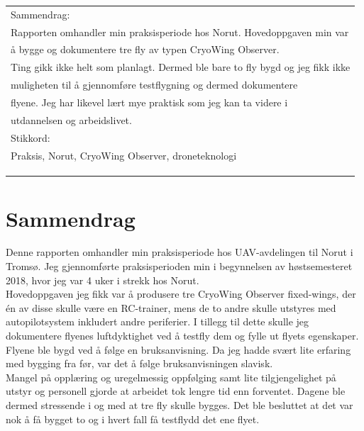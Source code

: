 \documentclass[12pt, a4paper]{article}
\begin{document}
\begin{flushleft}
	\begin{tabular}{ | l | }
		\hline
		Sammendrag: \hspace{14.7cm}
		\\
		Rapporten omhandler min praksisperiode hos Norut. Hovedoppgaven min var \\ å bygge og dokumentere tre fly av typen CryoWing Observer. \\
		Ting gikk ikke helt som planlagt. Dermed ble bare to fly bygd og jeg fikk ikke\\
		muligheten til å gjennomføre testflygning og dermed dokumentere\\ flyene.
		Jeg har likevel lært mye praktisk som 
		jeg kan ta videre i \\utdannelsen og arbeidslivet.
		\\
		\hline
		Stikkord: \\ Praksis, Norut, CryoWing Observer, droneteknologi\\ \\ \\ \\
		\hline
	\end{tabular}
\end{flushleft}

\clearpage


\section*{Sammendrag}
Denne rapporten omhandler min praksisperiode hos UAV-avdelingen til Norut i Tromsø. Jeg gjennomførte praksisperioden min i begynnelsen av høstsemesteret 2018, hvor jeg var 4 uker i strekk hos Norut. \\

Hovedoppgaven jeg fikk var å produsere tre CryoWing Observer fixed-wings, der én av disse skulle være en RC-trainer, mens de to andre skulle utstyres med autopilotsystem inkludert andre periferier. I tillegg til dette skulle jeg dokumentere flyenes luftdyktighet ved å testfly dem og fylle ut flyets egenskaper.\\

Flyene ble bygd ved å følge en bruksanvisning. Da jeg hadde svært lite erfaring med bygging fra før, var det å følge bruksanvisningen slavisk. \\

Mangel på opplæring og uregelmessig oppfølging samt lite tilgjengelighet på utstyr og personell gjorde at arbeidet tok lengre tid enn forventet. Dagene ble dermed stressende i og med at tre fly skulle bygges. Det ble besluttet at det var nok å få bygget to og i hvert fall få testflydd det ene flyet. \\
\end{document}

